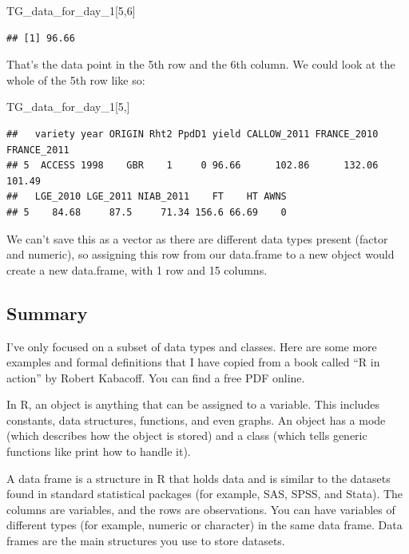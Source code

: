 \documentclass[
]{book}
\newenvironment{Shaded}{\begin{snugshade}}{\end{snugshade}}
\newcommand{\DecValTok}[1]{\textcolor[rgb]{0.00,0.00,0.81}{#1}}
\newcommand{\NormalTok}[1]{#1}
\begin{document}
\begin{Shaded}
\begin{Highlighting}[]
\NormalTok{TG\_data\_for\_day\_1[}\DecValTok{5}\NormalTok{,}\DecValTok{6}\NormalTok{]}
\end{Highlighting}
\end{Shaded}

\begin{verbatim}
## [1] 96.66
\end{verbatim}

That's the data point in the 5th row and the 6th column. We could look at the whole of the 5th row like so:

\begin{Shaded}
\begin{Highlighting}[]
\NormalTok{TG\_data\_for\_day\_1[}\DecValTok{5}\NormalTok{,]}
\end{Highlighting}
\end{Shaded}

\begin{verbatim}
##   variety year ORIGIN Rht2 PpdD1 yield CALLOW_2011 FRANCE_2010 FRANCE_2011
## 5  ACCESS 1998    GBR    1     0 96.66      102.86      132.06      101.49
##   LGE_2010 LGE_2011 NIAB_2011    FT    HT AWNS
## 5    84.68     87.5     71.34 156.6 66.69    0
\end{verbatim}

We can't save this as a vector as there are different data types present (factor and numeric), so assigning this row from our data.frame to a new object would create a new data.frame, with 1 row and 15 columns.

\hypertarget{summary}{%
\subsection{Summary}\label{summary}}

I've only focused on a subset of data types and classes. Here are some more examples and formal definitions that I have copied from a book called ``R in action'' by Robert Kabacoff. You can find a free PDF online.

In R, an object is anything that can be assigned to a variable. This includes constants, data structures, functions, and even graphs. An object has a mode (which describes how the object is stored) and a class (which tells generic functions like print how to handle it).

A data frame is a structure in R that holds data and is similar to the datasets found in standard statistical packages (for example, SAS, SPSS, and Stata). The columns are variables, and the rows are observations. You can have variables of different types (for example, numeric or character) in the same data frame. Data frames are the main structures you use to store datasets.
\end{document}
